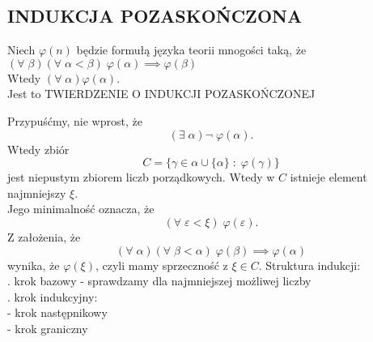 \subsection{INDUKCJA POZASKOŃCZONA}
\begin{center}\large
    Niech $\varphi(n)$ będzie formułą języka teorii mnogości taką, że\smallskip\\
    $(\forall\;\beta)(\forall\;\alpha<\beta)\;\varphi(\alpha)\implies\varphi(\beta)$\smallskip\\
    Wtedy $(\forall\;\alpha)\varphi(\alpha)$.\medskip\\
    Jest to {\color{def}TWIERDZENIE O INDUKCJI POZASKOŃCZONEJ}
\end{center}
\dowod
Przypuśćmy, nie wprost, że
$$(\exists\;\alpha)\neg\;\varphi(\alpha).$$
Wtedy zbiór
$$C=\{\gamma\in\alpha\cup\{\alpha\}\;:\;\varphi(\gamma)\}$$
jest niepustym zbiorem liczb porządkowych. Wtedy w $C$ istnieje element najmniejszy $\xi$. \\Jego minimalność oznacza, że
$$(\forall\;\varepsilon<\xi)\;\varphi(\varepsilon).$$
Z założenia, że
$$(\forall\;\alpha)(\forall\;\beta<\alpha)\;\varphi(\beta)\implies\varphi(\alpha)$$
wynika, że $\varphi(\xi)$, czyli mamy sprzeczność z $\xi\in C$.
\kondow
{\color{def}Struktura indukcji}:\medskip\\
. krok bazowy - sprawdzamy dla najmniejszej możliwej liczby\smallskip\\
. krok indukcyjny:\smallskip\\
\indent\indent - krok następnikowy\smallskip\\
\indent\indent - krok graniczny


